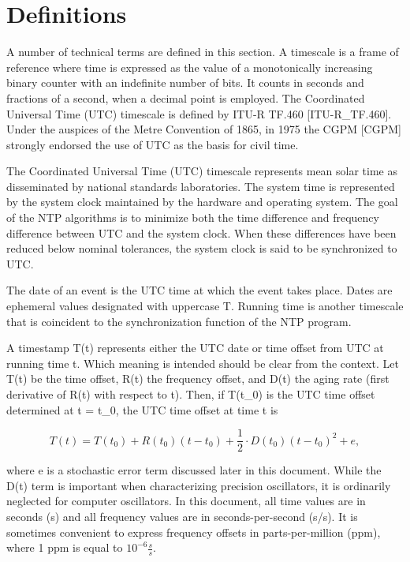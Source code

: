 \chapter{Definitions}

A number of technical terms are defined in this section. A timescale
is a frame of reference where time is expressed as the value of a
monotonically increasing binary counter with an indefinite number of
bits. It counts in seconds and fractions of a second, when a decimal
point is employed. The Coordinated Universal Time (UTC) timescale is
defined by ITU-R TF.460 [ITU-R\_TF.460]. Under the auspices of the
Metre Convention of 1865, in 1975 the CGPM [CGPM] strongly endorsed
the use of UTC as the basis for civil time.

The Coordinated Universal Time (UTC) timescale represents mean solar
time as disseminated by national standards laboratories. The system
time is represented by the system clock maintained by the hardware
and operating system. The goal of the NTP algorithms is to minimize
both the time difference and frequency difference between UTC and the
system clock. When these differences have been reduced below nominal
tolerances, the system clock is said to be synchronized to UTC.

The date of an event is the UTC time at which the event takes place.
Dates are ephemeral values designated with uppercase T. Running time
is another timescale that is coincident to the synchronization
function of the NTP program.

A timestamp T(t) represents either the UTC date or time offset from
UTC at running time t. Which meaning is intended should be clear
from the context. Let T(t) be the time offset, R(t) the frequency
offset, and D(t) the aging rate (first derivative of R(t) with
respect to t). Then, if T(t\_0) is the UTC time offset determined at
t = t\_0, the UTC time offset at time t is

$$
T(t) = T(t_0) + R(t_0)(t - t_0) + \frac{1}{2} \cdot D(t_0)(t - t_0)^2 + e,
$$

where e is a stochastic error term discussed later in this document.
While the D(t) term is important when characterizing precision
oscillators, it is ordinarily neglected for computer oscillators. In
this document, all time values are in seconds (s) and all frequency
values are in seconds-per-second (s/s). It is sometimes convenient
to express frequency offsets in parts-per-million (ppm), where 1 ppm
is equal to $ 10^{-6} \frac{s}{s} $.

